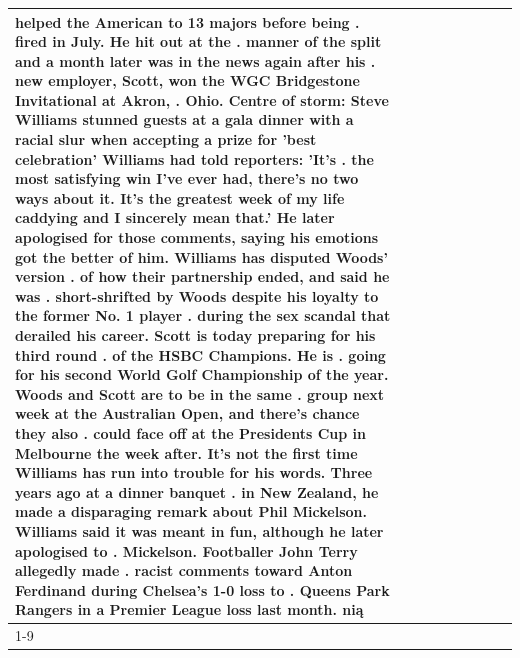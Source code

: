 \begin{table}[H]
\begin{tabular}{lllrlllll}
helped the American to 13 majors before being . fired in July. He hit out at the . manner of the split and a month later was in the news again after his . new employer, Scott, won the WGC Bridgestone Invitational at Akron, . Ohio. Centre of storm: Steve Williams stunned guests at a gala dinner with a racial slur when accepting a prize for 'best celebration' Williams had told reporters: 'It's . the most satisfying win I've ever had, there's no two ways about it. It's the greatest week of my life caddying and I sincerely mean that.' He later apologised for those comments, saying his emotions got the better of him. Williams has disputed Woods' version . of how their partnership ended, and said he was . short-shrifted by Woods despite his loyalty to the former No. 1 player . during the sex scandal that derailed his career. Scott is today preparing for his third round . of the HSBC Champions. He is . going for his second World Golf Championship of the year. Woods and Scott are to be in the same . group next week at the Australian Open, and there's chance they also . could face off at the Presidents Cup in Melbourne the week after. It's not the first time Williams has run into trouble for his words. Three years ago at a dinner banquet . in New Zealand, he made a disparaging remark about Phil Mickelson. Williams said it was meant in fun, although he later apologised to . Mickelson. Footballer John Terry allegedly made . racist comments toward Anton Ferdinand during Chelsea's 1-0 loss to . Queens Park Rangers in a Premier League loss last month. nią \\
\cline{1-9}

\end{tabular}
\end{table}

